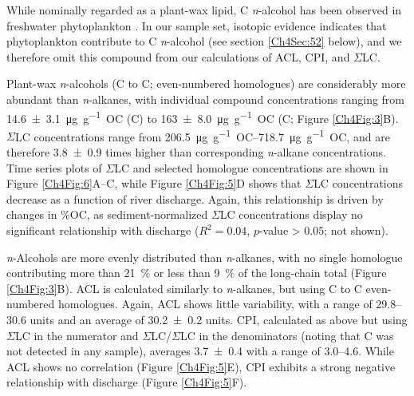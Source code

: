 While nominally regarded as a plant-wax lipid, C \textit{n}-alcohol has been observed in freshwater phytoplankton \citep{Volkman:1998tk,Volkman:1999tq,Xu:2007jk}. In our sample set, isotopic evidence indicates that phytoplankton contribute to C \textit{n}-alcohol (see section \ref{Ch4Sec:52} below), and we therefore omit this compound from our calculations of ACL, CPI, and $\Sigma$LC. 

Plant-wax \textit{n}-alcohols (C to C; even-numbered homologues) are considerably more abundant than \textit{n}-alkanes, with individual compound concentrations ranging from \SI{14.6 \pm 3.1}{\micro g.g^{-1}.OC} (C) to \SI{163 \pm 8.0}{\micro g.g^{-1}.OC} (C; Figure \ref{Ch4Fig:3}B). $\Sigma$LC concentrations range from \SIrange{206.5}{718.7}{\micro g.g^{-1}.OC}, and are therefore \num{3.8 \pm 0.9} times higher than corresponding \textit{n}-alkane concentrations. Time series plots of $\Sigma$LC and selected homologue concentrations are shown in Figure \ref{Ch4Fig:6}A--C, while Figure \ref{Ch4Fig:5}D shows that $\Sigma$LC concentrations decrease as a function of river discharge. Again, this relationship is driven by changes in \%OC, as sediment-normalized $\Sigma$LC concentrations display no significant relationship with discharge ($R^2 = 0.04$, $p$-value > $0.05$; not shown).

\textit{n}-Alcohols are more evenly distributed than \textit{n}-alkanes, with no single homologue contributing more than \SI{21}{\%} or less than \SI{9}{\%} of the long-chain total (Figure \ref{Ch4Fig:3}B). ACL is calculated similarly to \textit{n}-alkanes, but using C to C even-numbered homologues. Again, ACL shows little variability, with a range of \numrange{29.8}{30.6} units and an average of \num{30.2 \pm 0.2} units. CPI, calculated as above but using $\Sigma$LC in the numerator and $\Sigma$LC/$\Sigma$LC in the denominators (noting that C was not detected in any sample), averages \num{3.7 \pm 0.4} with a range of \numrange{3.0}{4.6}. While ACL shows no correlation (Figure \ref{Ch4Fig:5}E), CPI exhibits a strong negative relationship with discharge (Figure \ref{Ch4Fig:5}F).

